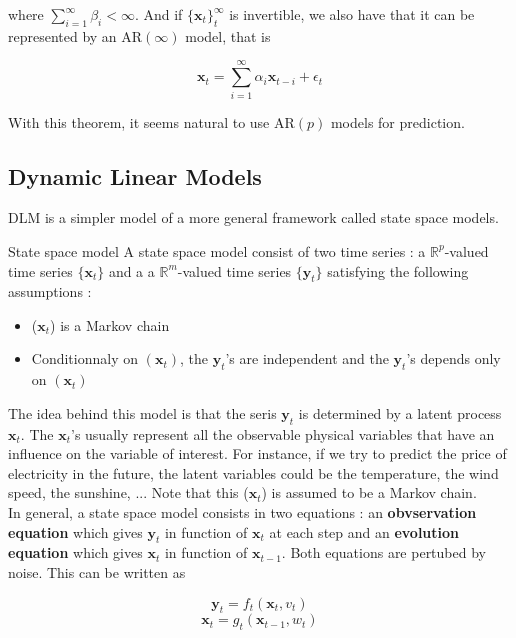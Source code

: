 \documentclass{article}
\begin{document}
where $\sum_{i=1}^\infty \beta_i < \infty$. And if $\{ \mathbf{x}_t \}_t^\infty$ is invertible, we also have that it can be represented by an AR$(\infty)$ model, that is

$$\mathbf{x}_t = \sum_{i=1}^{\infty} \alpha_i \mathbf{x}_{t-i} + \epsilon_t$$

With this theorem, it seems natural to use AR$(p)$ models for prediction.

\subsection*{Dynamic Linear Models}
DLM is a simpler model of a more general framework called state space models. \\

\begin{definition}{State space model}
A state space model consist of two time series : a $\mathbb{R}^p$-valued time series $\{\mathbf{x}_t\}$ and a a $\mathbb{R}^m$-valued time series $\{\mathbf{y}_t\}$ satisfying the following assumptions :

\begin{itemize}
        \item ($\mathbf{x}_t$) is a Markov chain
        \item Conditionnaly on $(\mathbf{x}_t)$, the $\mathbf{y}_t$'s are independent and the $\mathbf{y}_t$'s depends only on $(\mathbf{x}_t)$
\end{itemize}
\label{statespace}
\end{definition}

The idea behind this model is that the seris $\mathbf{y}_t$ is determined by a latent process $\mathbf{x}_t$. The $\mathbf{x}_t$'s usually represent all the observable physical variables that have an influence on the variable of interest. For instance, if we try to predict the price of electricity in the future, the latent variables could be the temperature, the wind speed, the sunshine, ... Note that this ($\mathbf{x}_t$) is assumed to be a Markov chain. \\

In general, a state space model consists in two equations : an \textbf{obvservation equation} which gives $\mathbf{y}_t$ in function of $\mathbf{x}_t$ at each step and an \textbf{evolution equation} which gives $\mathbf{x}_t$ in function of $\mathbf{x}_{t-1}$. Both equations are pertubed by noise. This can be written as

$$\mathbf{y}_t = f_t(\mathbf{x}_t, v_t)$$
$$\mathbf{x}_t = g_t(\mathbf{x}_{t-1}, w_t)$$
\end{document}
